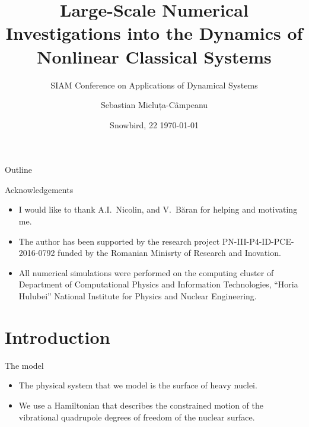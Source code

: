 \documentclass{beamer}
\title{Large-Scale Numerical Investigations into the Dynamics of Nonlinear Classical Systems}
\subtitle{SIAM Conference on Applications of Dynamical Systems}
\date{Snowbird, 22 \printdayoff\today}
\author{Sebastian Micluța-Câmpeanu}
\institute{University of Bucharest}
\begin{document}
\maketitle%


\begin{frame}{Outline}
  \tableofcontents[]
\end{frame}


\begin{frame}{Acknowledgements}
	\begin{itemize}
		\item I would like to thank A.I.~Nicolin, and V.~Băran for helping and motivating me.
		\item The author has been	supported by the research project PN-III-P4-ID-PCE-2016-0792
		funded by the Romanian Minisrty of Research and Inovation.
		\item All numerical simulations were performed on the computing cluster of
		Department of Computational Physics and Information Technologies,
		``Horia Hulubei'' National Institute for Physics and Nuclear Engineering.
	\end{itemize}
\end{frame}

\section{Introduction}


\begin{frame}{The model}
  \begin{itemize}
		\item The physical system that we model \cite{micluta-campeanu2018} is the surface of heavy nuclei.
    \item We use a Hamiltonian that describes the constrained
		motion of the vibrational quadrupole degrees of freedom of
		the nuclear surface.
  \end{itemize}
\end{frame}

\end{document}
